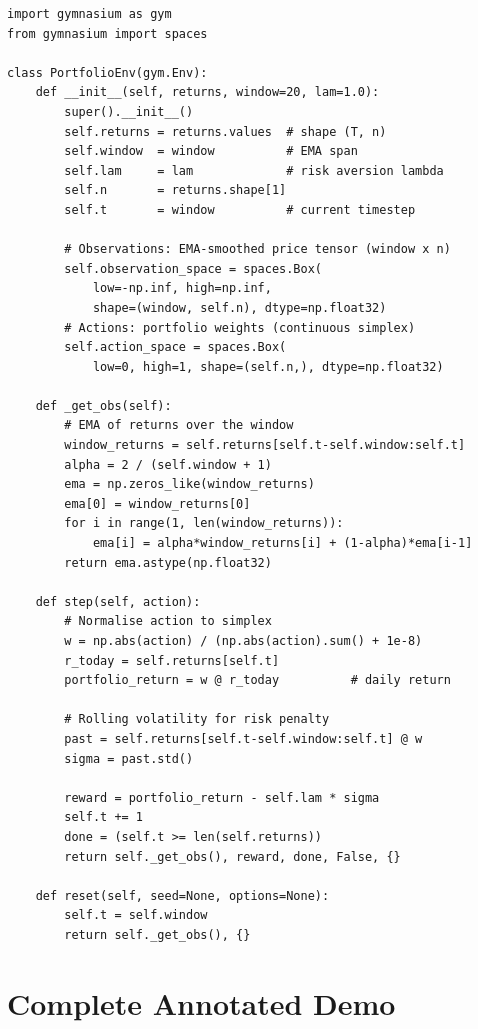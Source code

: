 \documentclass[12pt,a4paper]{article}
\begin{document}
\begin{lstlisting}[caption={Simplified custom portfolio environment},label={lst:env}]
import gymnasium as gym
from gymnasium import spaces

class PortfolioEnv(gym.Env):
    def __init__(self, returns, window=20, lam=1.0):
        super().__init__()
        self.returns = returns.values  # shape (T, n)
        self.window  = window          # EMA span
        self.lam     = lam             # risk aversion lambda
        self.n       = returns.shape[1]
        self.t       = window          # current timestep

        # Observations: EMA-smoothed price tensor (window x n)
        self.observation_space = spaces.Box(
            low=-np.inf, high=np.inf,
            shape=(window, self.n), dtype=np.float32)
        # Actions: portfolio weights (continuous simplex)
        self.action_space = spaces.Box(
            low=0, high=1, shape=(self.n,), dtype=np.float32)

    def _get_obs(self):
        # EMA of returns over the window
        window_returns = self.returns[self.t-self.window:self.t]
        alpha = 2 / (self.window + 1)
        ema = np.zeros_like(window_returns)
        ema[0] = window_returns[0]
        for i in range(1, len(window_returns)):
            ema[i] = alpha*window_returns[i] + (1-alpha)*ema[i-1]
        return ema.astype(np.float32)

    def step(self, action):
        # Normalise action to simplex
        w = np.abs(action) / (np.abs(action).sum() + 1e-8)
        r_today = self.returns[self.t]
        portfolio_return = w @ r_today          # daily return

        # Rolling volatility for risk penalty
        past = self.returns[self.t-self.window:self.t] @ w
        sigma = past.std()

        reward = portfolio_return - self.lam * sigma
        self.t += 1
        done = (self.t >= len(self.returns))
        return self._get_obs(), reward, done, False, {}

    def reset(self, seed=None, options=None):
        self.t = self.window
        return self._get_obs(), {}
\end{lstlisting}

\section{Complete Annotated Demo}
\end{document}
